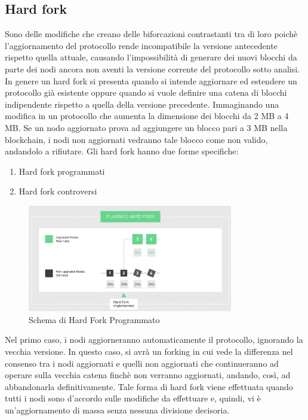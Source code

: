 \subsection{Hard fork}
Sono delle modifiche che creano delle biforcazioni contrastanti tra di loro poichè l'aggiornamento del protocollo rende incompatibile la versione antecedente rispetto quella attuale, causando l'impossibilità di generare dei nuovi blocchi da parte dei nodi ancora non aventi la versione corrente del protocollo sotto analisi. In genere un hard fork si presenta quando si intende aggiornare ed estendere un protocollo già esistente oppure quando si vuole definire una catena di blocchi indipendente rispetto a quella della versione precedente. 
Immaginando una modifica in un protocollo che aumenta la dimensione dei blocchi da 2 MB a 4 MB. Se un nodo aggiornato prova ad aggiungere un blocco pari a 3 MB nella blockchain, i nodi non aggiornati vedranno tale blocco come non valido, andandolo a rifiutare.
Gli hard fork hanno due forme specifiche:
\begin{enumerate}
    \item Hard fork programmati
    \item Hard fork controversi
\end{enumerate}
\begin{figure}[h]
    \centering
    \includegraphics[width=0.8\textwidth]{img/planned-fork.png}
    \caption{Schema di Hard Fork Programmato}
    \label{fig:planned-fork}
\end{figure}
Nel primo caso, i nodi aggiorneranno automaticamente il protocollo, ignorando la vecchia versione. In questo caso, si avrà un forking in cui vede la differenza nel consenso tra i nodi aggiornati e quelli non aggiornati che continueranno ad operare sulla vecchia catena finchè non verranno aggiornati, andando, così, ad abbandonarla definitivamente. Tale forma di hard fork viene effettuata quando tutti i nodi sono d'accordo sulle modifiche da effettuare e, quindi, vi è un'aggiornamento di massa senza nessuna divisione decisoria. 
